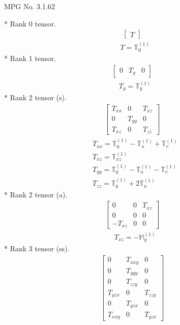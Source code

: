 \documentclass[fleqn,8pt,landscape]{jsarticle}
\begin{document}
\setcounter{MaxMatrixCols}{32}

\renewcommand{\tablename}{Table~}
\renewcommand{\figurename}{Figure~}
\begin{center}
\LARGE
MPG No. 3.1.6\quad$2$
\end{center}
* Rank 0 tensor.
\begin{align*}
\begin{bmatrix} T \end{bmatrix}
\end{align*}
\begin{align*}
& T = \mathbb{T}_{0}^{(1)}
\end{align*}
* Rank 1 tensor.
\begin{align*}
\begin{bmatrix} 0 & T_{y} & 0 \end{bmatrix}
\end{align*}
\begin{align*}
& T_{y} = \mathbb{T}_{y}^{(1)}
\end{align*}
* Rank 2 tensor (s).
\begin{align*}
\begin{bmatrix} T_{xx} & 0 & T_{xz} \\ 0 & T_{yy} & 0 \\ T_{xz} & 0 & T_{zz} \end{bmatrix}
\end{align*}
\begin{align*}
& T_{xx} = \mathbb{T}_{0}^{(1)} - \mathbb{T}_{u}^{(1)} + \mathbb{T}_{v}^{(1)} \\
& T_{xz} = \mathbb{T}_{xz}^{(1)} \\
& T_{yy} = \mathbb{T}_{0}^{(1)} - \mathbb{T}_{u}^{(1)} - \mathbb{T}_{v}^{(1)} \\
& T_{zz} = \mathbb{T}_{0}^{(1)} + 2 \mathbb{T}_{u}^{(1)}
\end{align*}
* Rank 2 tensor (a).
\begin{align*}
\begin{bmatrix} 0 & 0 & T_{xz} \\ 0 & 0 & 0 \\ - T_{xz} & 0 & 0 \end{bmatrix}
\end{align*}
\begin{align*}
& T_{xz} = - \mathbb{M}_{y}^{(1)}
\end{align*}
* Rank 3 tensor (ss).
\begin{align*}
\begin{bmatrix} 0 & T_{xxy} & 0 \\ 0 & T_{yyy} & 0 \\ 0 & T_{zzy} & 0 \\ T_{yzx} & 0 & T_{zzy} \\ 0 & T_{yzx} & 0 \\ T_{xxy} & 0 & T_{yzx} \end{bmatrix}
\end{align*}
\end{document}

